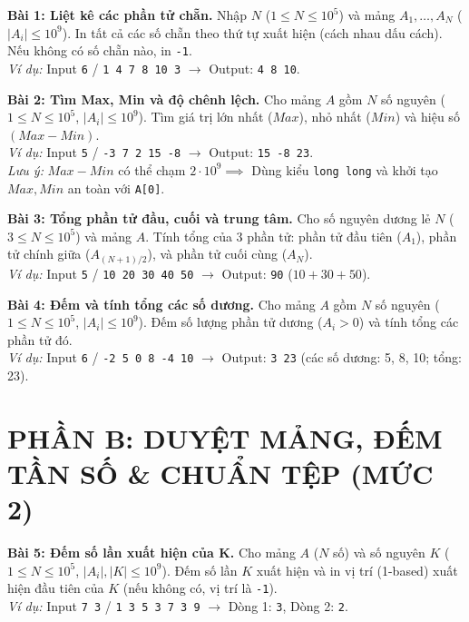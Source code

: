 \documentclass[11pt,a4paper]{article}
\begin{document}
\textbf{\color{AsianBlue}Bài 1: Liệt kê các phần tử chẵn.} Nhập $N$ ($1 \le N \le 10^5$) và mảng $A_1, \dots, A_N$ ($|A_i| \le 10^9$). In tất cả các số chẵn theo thứ tự xuất hiện (cách nhau dấu cách). Nếu không có số chẵn nào, in \texttt{-1}.\\
\textit{Ví dụ:} Input \texttt{6} / \texttt{1 4 7 8 10 3} $\to$ Output: \texttt{4 8 10}.

\vspace{0.1cm}
\noindent
\textbf{\color{AsianBlue}Bài 2: Tìm Max, Min và độ chênh lệch.} Cho mảng $A$ gồm $N$ số nguyên ($1 \le N \le 10^5$, $|A_i| \le 10^9$). Tìm giá trị lớn nhất ($Max$), nhỏ nhất ($Min$) và hiệu số $(Max - Min)$.\\
\textit{Ví dụ:} Input \texttt{5} / \texttt{-3 7 2 15 -8} $\to$ Output: \texttt{15 -8 23}.\\
\textit{Lưu ý:} $Max - Min$ có thể chạm $2 \cdot 10^9 \implies$ Dùng kiểu \texttt{long long} và khởi tạo $Max, Min$ an toàn với \texttt{A[0]}.

\vspace{0.1cm}
\noindent
\textbf{\color{AsianBlue}Bài 3: Tổng phần tử đầu, cuối và trung tâm.} Cho số nguyên dương lẻ $N$ ($3 \le N \le 10^5$) và mảng $A$. Tính tổng của 3 phần tử: phần tử đầu tiên ($A_1$), phần tử chính giữa ($A_{(N+1)/2}$), và phần tử cuối cùng ($A_N$).\\
\textit{Ví dụ:} Input \texttt{5} / \texttt{10 20 30 40 50} $\to$ Output: \texttt{90} ($10 + 30 + 50$).

\vspace{0.1cm}
\noindent
\textbf{\color{AsianBlue}Bài 4: Đếm và tính tổng các số dương.} Cho mảng $A$ gồm $N$ số nguyên ($1 \le N \le 10^5$, $|A_i| \le 10^9$). Đếm số lượng phần tử dương ($A_i > 0$) và tính tổng các phần tử đó.\\
\textit{Ví dụ:} Input \texttt{6} / \texttt{-2 5 0 8 -4 10} $\to$ Output: \texttt{3 23} (các số dương: 5, 8, 10; tổng: 23).

\vspace{-0.2cm}
\section*{\color{AsianDarkBlue}\small PHẦN B: DUYỆT MẢNG, ĐẾM TẦN SỐ \& CHUẨN TỆP (MỨC 2)}
\vspace{-0.2cm}

\textbf{\color{AsianBlue}Bài 5: Đếm số lần xuất hiện của K.} Cho mảng $A$ ($N$ số) và số nguyên $K$ ($1 \le N \le 10^5$, $|A_i|, |K| \le 10^9$). Đếm số lần $K$ xuất hiện và in vị trí (1-based) xuất hiện đầu tiên của $K$ (nếu không có, vị trí là \texttt{-1}).\\
\textit{Ví dụ:} Input \texttt{7 3} / \texttt{1 3 5 3 7 3 9} $\to$ Dòng 1: \texttt{3}, Dòng 2: \texttt{2}.
\end{document}
